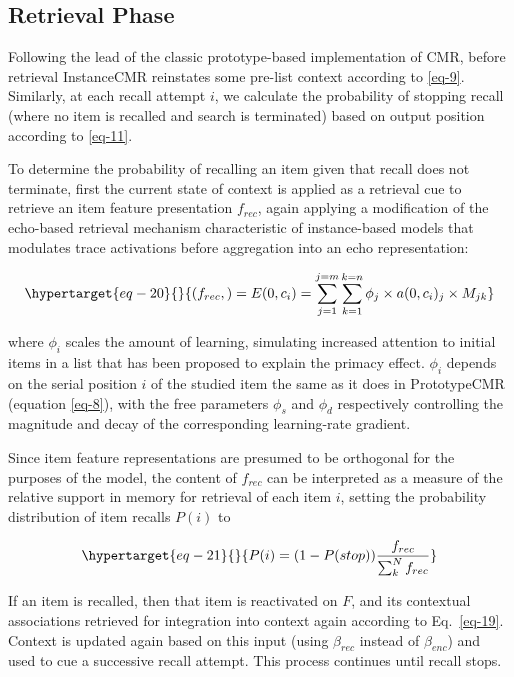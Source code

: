 \documentclass[
  letterpaper,
  DIV=11]{article}
\begin{document}
\hypertarget{retrieval-phase-1}{%
\subsection{Retrieval Phase}\label{retrieval-phase-1}}

Following the lead of the classic prototype-based implementation of CMR,
before retrieval InstanceCMR reinstates some pre-list context according
to \ref{eq-9}. Similarly, at each recall attempt \(i\), we calculate the
probability of stopping recall (where no item is recalled and search is
terminated) based on output position according to \ref{eq-11}.

To determine the probability of recalling an item given that recall does
not terminate, first the current state of context is applied as a
retrieval cue to retrieve an item feature presentation \(f_{rec}\),
again applying a modification of the echo-based retrieval mechanism
characteristic of instance-based models that modulates trace activations
before aggregation into an echo representation:

\begin{equation}\protect\hypertarget{eq-20}{}{
(f_{rec},) = E(0, c_i) = \sum^{j=m}_{j=1}\sum^{k=n}_{k=1} {\phi}_j \times a(0, c_i)_j \times M_{jk}
}\label{eq-20}\end{equation}

where \({\phi}_i\) scales the amount of learning, simulating increased
attention to initial items in a list that has been proposed to explain
the primacy effect. \({\phi}_i\) depends on the serial position \(i\) of
the studied item the same as it does in PrototypeCMR (equation
\ref{eq-8}), with the free parameters \({\phi}_s\) and \({\phi}_d\)
respectively controlling the magnitude and decay of the corresponding
learning-rate gradient.

Since item feature representations are presumed to be orthogonal for the
purposes of the model, the content of \(f_{rec}\) can be interpreted as
a measure of the relative support in memory for retrieval of each item
\(i\), setting the probability distribution of item recalls \(P(i)\) to

\begin{equation}\protect\hypertarget{eq-21}{}{
P(i) = (1-P(stop))\frac{f_{rec}}{\sum_{k}^{N}f_{rec}}
}\label{eq-21}\end{equation}

If an item is recalled, then that item is reactivated on \(F\), and its
contextual associations retrieved for integration into context again
according to Eq.~\ref{eq-19}. Context is updated again based on this
input (using \(\beta_{rec}\) instead of \(\beta_{enc}\)) and used to cue
a successive recall attempt. This process continues until recall stops.
\end{document}
